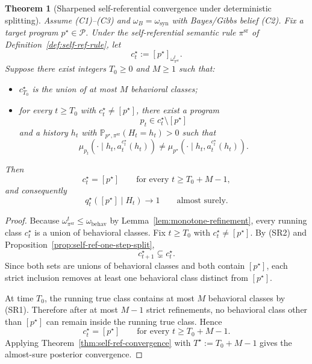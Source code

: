 \documentclass[11pt]{article}
\newtheorem{theorem}{Theorem}[section]
\theoremstyle{definition}
\theoremstyle{remark}
\newcommand{\Pcal}{\mathcal{P}}
\newcommand{\Prob}{\mathbb{P}}
\begin{document}
\begin{theorem}[Sharpened self-referential convergence under deterministic splitting]
\label{thm:self-ref-sharp}
Assume \textup{(C1)--(C3)} and $\omega_B=\omega_{\mathrm{syn}}$ with Bayes/Gibbs belief \textup{(C2)}. Fix a target program $p^\star\in\Pcal$. Under the self-referential semantic rule $\pi^{\mathrm{sr}}$ of Definition~\ref{def:self-ref-rule}, let
\[
c_t^\star:=[p^\star]_{\omega_{\pi^{\mathrm{sr}}}^t}.
\]
Suppose there exist integers $T_0\ge 0$ and $M\ge 1$ such that:
\begin{itemize}
\item[(SR1)] $c_{T_0}^\star$ is the union of at most $M$ behavioral classes;
\item[(SR2)] for every $t\ge T_0$ with $c_t^\star\neq [p^\star]$, there exist a program
\[
p_t\in c_t^\star\setminus[p^\star]
\]
and a history $h_t$ with $\Prob_{p^\star,\pi^{\mathrm{sr}}}(H_t=h_t)>0$ such that
\[
\mu_{p_t}(\cdot\mid h_t,a_t^{c_t^\star}(h_t))
\neq
\mu_{p^\star}(\cdot\mid h_t,a_t^{c_t^\star}(h_t)).
\]
\end{itemize}
Then
\[
c_t^\star=[p^\star]
\qquad\text{for every }t\ge T_0+M-1,
\]
and consequently
\[
q_t^\star([p^\star]\mid H_t)\longrightarrow 1
\qquad\text{almost surely.}
\]
\end{theorem}

\begin{proof}
Because $\omega_{\pi^{\mathrm{sr}}}^t\le\omega_{\mathrm{behav}}$ by Lemma~\ref{lem:monotone-refinement}, every running class $c_t^\star$ is a union of behavioral classes. Fix $t\ge T_0$ with $c_t^\star\neq[p^\star]$. By (SR2) and Proposition~\ref{prop:self-ref-one-step-split},
\[
c_{t+1}^\star\subsetneq c_t^\star.
\]
Since both sets are unions of behavioral classes and both contain $[p^\star]$, each strict inclusion removes at least one behavioral class distinct from $[p^\star]$.

At time $T_0$, the running true class contains at most $M$ behavioral classes by (SR1). Therefore after at most $M-1$ strict refinements, no behavioral class other than $[p^\star]$ can remain inside the running true class. Hence
\[
c_t^\star=[p^\star]
\qquad\text{for every }t\ge T_0+M-1.
\]
Applying Theorem~\ref{thm:self-ref-convergence} with $T^\star:=T_0+M-1$ gives the almost-sure posterior convergence.
\end{proof}
\end{document}
